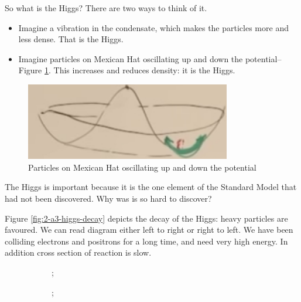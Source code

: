 \documentclass[]{article}
\begin{document}
So what is the Higgs? There are two ways to think of it.
\begin{itemize}
	\item Imagine a vibration in the condensate, which makes the particles more and less dense. That is the Higgs.
	\item Imagine particles on Mexican Hat oscillating up and down the potential--Figure \ref{fig:2-a3-higgs1}. This increases and reduces density: it is the Higgs.
\end{itemize}

\begin{figure}[H]
	\caption{Particles on Mexican Hat oscillating up and down the potential}\label{fig:2-a3-higgs1}
	\includegraphics[width=0.8\textwidth]{2-a3-higgs1}
\end{figure}

The Higgs is important because it is the one element of the Standard Model that had not been discovered. Why was is so hard to discover?

Figure \ref{fig:2-a3-higgs-decay} depicts the decay of the Higgs: heavy particles are favoured. We can read diagram either left to right or right to left. We have been colliding electrons and positrons for a long time, and need very high energy. In addition cross section of reaction is slow.

\begin{figure}[H]
	\begin{center}
		\caption{Higgs decaying: probability $\propto$ mass of particles produced}\label{fig:2-a3-higgs-decay}
		\begin{subfigure}[t]{0.45\textwidth}
			;
		\end{subfigure}
		\hfill
		\begin{subfigure}[t]{0.45\textwidth}
			;
		\end{subfigure}

	\end{center}
\end{figure}
\end{document}
